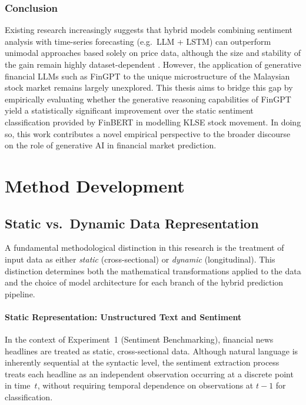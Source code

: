 \documentclass[12pt]{ucetd}
\begin{document}
\subsubsection{Conclusion}

Existing research increasingly suggests that hybrid models combining sentiment analysis with time-series forecasting (e.g.\ LLM + LSTM) can outperform unimodal approaches based solely on price data, although the size and stability of the gain remain highly dataset-dependent \cite{ding2015deep, halder2024finbert, soliman2025improving}. However, the application of generative financial LLMs such as FinGPT to the unique microstructure of the Malaysian stock market remains largely unexplored. This thesis aims to bridge this gap by empirically evaluating whether the generative reasoning capabilities of FinGPT yield a statistically significant improvement over the static sentiment classification provided by FinBERT in modelling KLSE stock movement. In doing so, this work contributes a novel empirical perspective to the broader discourse on the role of generative AI in financial market prediction.


\section{Method Development}

\subsection{Static vs.\ Dynamic Data Representation}

A fundamental methodological distinction in this research is the treatment of input data as either \emph{static} (cross-sectional) or \emph{dynamic} (longitudinal). This distinction determines both the mathematical transformations applied to the data and the choice of model architecture for each branch of the hybrid prediction pipeline.

\paragraph{Static Representation: Unstructured Text and Sentiment}

In the context of Experiment~1 (Sentiment Benchmarking), financial news headlines are treated as static, cross-sectional data. Although natural language is inherently sequential at the syntactic level, the sentiment extraction process treats each headline as an independent observation occurring at a discrete point in time~$t$, without requiring temporal dependence on observations at $t-1$ for classification.
\end{document}
